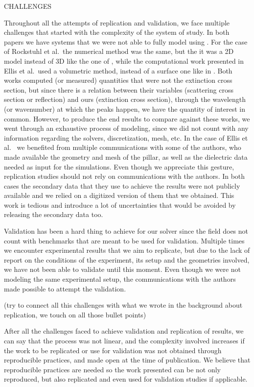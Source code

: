 CHALLENGES 

Throughout all the attempts of replication and validation, we face multiple challenges that started with the complexity of the system of study. In both papers we have systems that we were not able to fully 
model using \pygbe. For the case of Rockstuhl et al.\ the numerical method was the same, but the it was a 2D model instead of 3D like the one of \pygbe, while the computational work presented in Ellis et al.\ used a volumetric 
method, instead of a surface one like in \pygbe. Both works computed (or measured) quantities that were not the extinction cross section, but since there is a relation between their variables (scattering cross section or reflection)  
and ours (extinction cross section), through the wavelength (or wavenumber) at which the peaks happen, we have the quantity of interest in common. However, to produce the end results to compare against these works, we went through an 
exhaustive process of modeling, since we did not count with any information regarding the solvers, discretization, mesh, etc. In the case of Ellis et al. \ we benefited from multiple communications with some of the authors, 
who made available the geometry and mesh of the pillar, as well as the dielectric data needed as input for the simulations. Even though we appreciate this gesture, replication studies should not rely on communications with the authors. 
In both cases the secondary data that they use to achieve the results were not publicly available and we relied on a digitized version of them that we obtained. This work is tedious and introduce a lot of uncertainties that would be avoided by releasing 
the secondary data too. 

Validation has been a hard thing to achieve for our solver since the field does not count with benchmarks that are meant to be used for validation. Multiple times
we encounter experimental results that we aim to replicate, but due to the lack of report on the conditions of the experiment, its setup and the geometries involved, 
we have not been able to validate until this moment. Even though we were not modeling the same experimental setup, the communications with the authors made possible to 
attempt the validation.

(try to connect all this challenges with what we wrote in the background about replication, we touch on all those bullet points)

After all the challenges faced to achieve validation and replication of results, we can say that the process was not linear, 
and the complexity involved increases if the work to be replicated or use for validation was not obtained through reproducible practices, and made open at the time 
of publication. We believe that reproducible practices are needed so the work presented can be not only reproduced, but also 
replicated and even used for validation studies if applicable.
